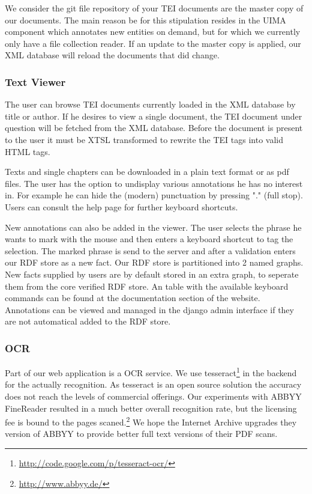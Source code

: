 \documentclass[12pt, draft]{article}
\begin{document}
We consider the git file repository of your TEI documents are the master copy
of our documents.  The main reason be for this stipulation resides in the
UIMA component which annotates new entities on demand, but for which we
currently only have a file collection reader.  If an update to the master copy
is applied, our XML database will reload the documents that did change.

\subsubsection{Text Viewer}

The user can browse TEI documents currently loaded in the XML database by title
or author.  If he desires to view a single document, the TEI document under question
will be fetched from the XML database.  Before the document is present to the
user it must be XTSL transformed to rewrite the TEI tags into valid HTML
tags.

Texts and single chapters can be downloaded in a plain text format or as pdf files.
The user has the option to undisplay various annotations he has no interest in. For example
he can hide the (modern) punctuation by pressing "." (full stop).  Users can consult the
help page for further keyboard shortcuts.

New annotations can also be added in the viewer. The user selects the phrase he wants
to mark with the mouse and then enters a keyboard shortcut to tag the selection.
The marked phrase is send to the server and after a validation enters
our RDF store as a new fact.  Our RDF store is partitioned into 2 named graphs.
New facts supplied by users are by default stored in an extra graph, to seperate them
from the core verified RDF store.  An table with the available keyboard commands
can be found at the documentation section of the website.
Annotations can be viewed and managed in the django admin interface if they are not
automatical added to the RDF store.

\subsubsection{OCR}

Part of our web application is a OCR service.  We use tesseract\footnote{\url{http://code.google.com/p/tesseract-ocr/}}
 in the backend for the
actually recognition.  As tesseract is an open source solution the accuracy does not
reach the levels of commercial offerings.  Our experiments with ABBYY FineReader
resulted in a much better overall recognition rate, but the licensing fee is bound
to the pages scaned.\footnote{\url{http://www.abbyy.de/}}
We hope the Internet Archive upgrades they version of ABBYY to provide better full text
versions of their PDF scans.
\end{document}
